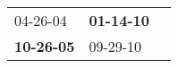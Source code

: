 \begin{supertabular}{p{0.33\columnwidth}p{0.33\columnwidth}p{0.33\columnwidth}}
          04-26-04\textsuperscript{} &  \textbf{01-14-10\textsuperscript{}} \\
 \textbf{10-26-05\textsuperscript{}} &           09-29-10\textsuperscript{} \\
\end{supertabular}
